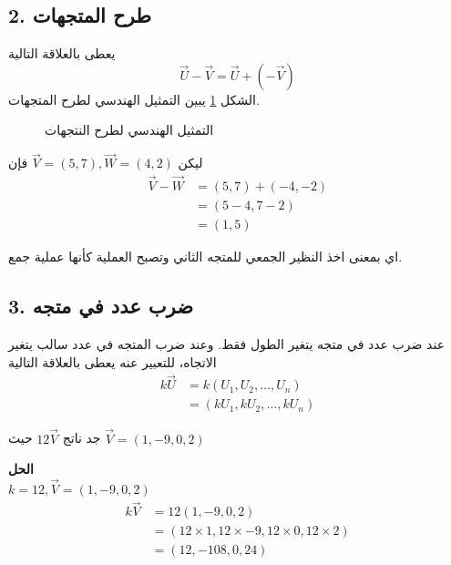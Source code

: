 \subsection*{2. طرح المتجهات}
يعطى بالعلاقة التالية
\[
\vec{U} - \vec{V} = \vec{U} + (-\vec{V})
\]
الشكل \ref{fig:vecdiff} يبين التمثيل الهندسي لطرح المتجهات.
	\begin{figure}[ht]
	\centering
	\caption{التمثيل الهندسي لطرح النتجهات}
	\label{fig:vecdiff}
\end{figure}

\begin{example}
	ليكن
	$\vec{V}=(5, 7), \vec{W} = (4,2)$
	فإن 
	\begin{align*}
		\vec{V}-\vec{W} &= (5,7) + (-4, -2)\\
		&= (5-4, 7-2)\\
		&= (1,5)
	\end{align*}
\end{example}
\noindent
اي بمعنى اخذ النظير الجمعي للمتجه الثاني وتصبح العملية كأنها عملية جمع.

\subsection*{3. ضرب عدد في متجه}
عند ضرب عدد في متجه يتغير الطول فقط. وعند ضرب المتجه في عدد سالب يتغير الاتجاه، للتعبير عنه يعطى بالعلاقة التالية
\begin{align*}
	k \vec{U} &= k(U_1, U_2, \dots, U_n)\\
	&= (kU_1, kU_2, \dots, kU_n)
\end{align*}

\begin{example}
	جد ناتج $12\vec{V}$ حيث $\vec{V}=(1,-9,0,2)$
\end{example}
\noindent
\textbf{الحل}\\
\noindent
$k=12, \vec{V}=(1,-9,0,2)$
\begin{align*}
	k\vec{V} &= 12(1,-9,0,2)\\
	&= (12\times1, 12\times-9, 12\times0, 12\times2)\\
	&= (12, -108, 0, 24)
\end{align*}

